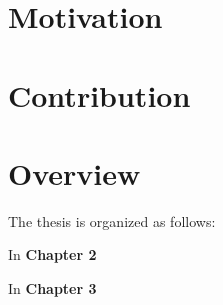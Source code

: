 \documentclass{sfuthesis}
\begin{document}





\section{Motivation}


\section{Contribution}



\section{Overview}
The thesis is organized as follows:

In \textbf{Chapter 2}  

In \textbf{Chapter 3} 
\end{document}
